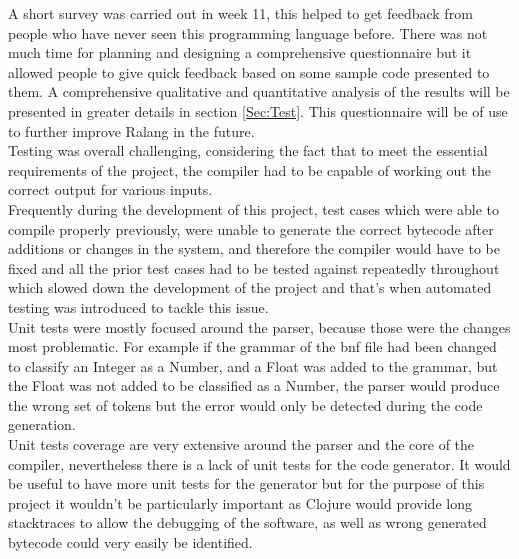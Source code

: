\documentclass[a4paper]{article}
\begin{document}
	A short survey was carried out in week 11, this helped to get feedback from people who have never seen this programming language before. There was not much time for planning and designing a comprehensive questionnaire but it allowed people to give quick feedback based on some sample code presented to them. A comprehensive qualitative and quantitative analysis of the results will be presented in greater details in section \ref{Sec:Test}. This questionnaire will be of use to further improve Ralang in the future.\\
	
	Testing was overall challenging, considering the fact that to meet the essential requirements of the project, the compiler had to be capable of working out the correct output for various inputs.\\
	
	Frequently during the development of this project, test cases which were able to compile properly previously, were unable to generate the correct bytecode after additions or changes in the system, and therefore the compiler would have to be fixed and all the prior test cases had to be tested against repeatedly throughout which slowed down the development of the project and that's when automated testing was introduced to tackle this issue.\\
	
	Unit tests were mostly focused around the parser, because those were the changes most problematic. For example if the grammar of the \ac{bnf} file had been changed to classify an Integer as a Number, and a Float was added to the grammar, but the Float was not added to be classified as a Number, the parser would  produce the wrong set of tokens but the error would only be detected during the code generation.\\
	
	Unit tests coverage are very extensive around the parser and the core of the compiler, nevertheless there is a lack of unit tests for the code generator. It would be useful to have more unit tests for the generator but for the purpose of this project it wouldn't be particularly important as Clojure would provide long stacktraces to allow the debugging of the software, as well as wrong generated bytecode could very easily be identified.\\
	
\end{document}
